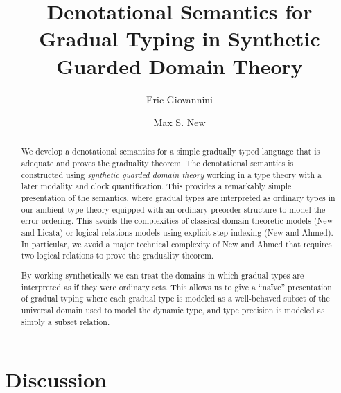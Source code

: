 \documentclass[acmsmall,screen]{acmart}
\begin{document}
\title{Denotational Semantics for Gradual Typing in Synthetic Guarded Domain Theory}
\author{Eric Giovannini}
\author{Max S. New}


\begin{abstract}
    We develop a denotational semantics for a simple gradually typed language
    that is adequate and proves the graduality theorem.
    The denotational semantics is constructed using \emph{synthetic
    guarded domain theory} working in a type theory with a later
    modality and clock quantification.
    This provides a remarkably simple presentation of the semantics,
    where gradual types are interpreted as ordinary types in our ambient
    type theory equipped with an ordinary preorder structure to model
    the error ordering.
    This avoids the complexities of classical domain-theoretic models
    (New and Licata) or logical relations models using explicit
    step-indexing (New and Ahmed).
    In particular, we avoid a major technical complexity of New and
    Ahmed that requires two logical relations to prove the graduality
    theorem.
  
    By working synthetically we can treat the domains in which gradual
    types are interpreted as if they were ordinary sets. This allows us
    to give a ``na\"ive'' presentation of gradual typing where each
    gradual type is modeled as a well-behaved subset of the universal
    domain used to model the dynamic type, and type precision is modeled
    as simply a subset relation.
  \end{abstract}

  \maketitle











\section{Discussion}\label{sec:discussion}






\end{document}
